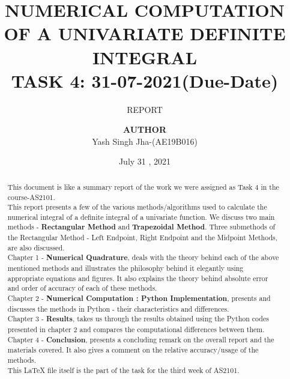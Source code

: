 \documentclass[a4paper, 12pt]{report}
\institute{Department Of Aerospace Engineering}
\title{NUMERICAL COMPUTATION OF A UNIVARIATE DEFINITE INTEGRAL\\TASK 4: 31-07-2021(Due-Date) }
\subtitle{REPORT}
\author{\textbf{AUTHOR}\\Yash Singh Jha-(AE19B016)\\ }
\date{July 31 , 2021}
\begin{document}
    \maketitle
    \romantableofcontents
    \listoffigures
    \begin{abstract}
    This document is like a summary report of the work we were assigned as Task 4 in the course-AS2101.\\
    This report presents a few of the various methods/algorithms used to calculate the numerical integral of a definite integral of a univariate function. We discuss two main methods - \textbf{Rectangular Method} and \textbf{Trapezoidal Method}. Three submethods of the Rectangular Method - Left Endpoint, Right Endpoint and the Midpoint Methods, are also discussed. \\
    Chapter 1 - \textbf{Numerical Quadrature}, deals with the theory behind each of the above mentioned methods and illustrates the philosophy behind it elegantly using appropriate equations and figures. It also explains the theory behind absolute error and order of accuracy of each of these methods.\\
    Chapter 2 - \textbf{Numerical Computation : Python Implementation}, presents and discusses the methods in Python -  their characteristics and differences.\\
    Chapter 3 - \textbf{Results}, takes us through the results obtained using the Python codes presented in chapter 2 and compares the computational differences between them.\\
    Chapter 4 - \textbf{Conclusion}, presents a concluding remark on the overall report and the materials covered. It also gives a comment on the relative accuracy/usage of the methods.\\
    This LaTeX file itself is the part of the task for the third week of AS2101.
    \end{abstract}
    
\end{document}
